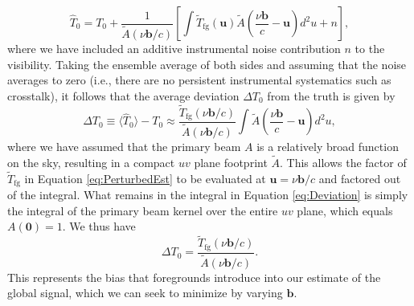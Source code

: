 \documentclass[twocolumn,apj,numberedappendix]{emulateapj}
\begin{document}
\begin{equation}
\label{eq:PerturbedEst}
\widehat{T}_0 = T_0 + \frac{1}{\widetilde{A} \left( \nu \mathbf{b} / c \right)} \left[ \int  \widetilde{T}_\textrm{fg} (\mathbf{u}) \widetilde{A} \left( \frac{\nu \mathbf{b}}{c} - \mathbf{u} \right) d^2 u + n \right],
\end{equation}
where we have included an additive instrumental noise contribution $n$ to the visibility.  Taking the ensemble average of both sides and assuming that the noise averages to zero (i.e., there are no persistent instrumental systematics such as crosstalk), it follows that the average deviation $\Delta T_0$ from the truth is given by
\begin{equation}
\label{eq:Deviation}
\Delta T_0 \equiv \langle \widehat{T}_0 \rangle - T_0 \approx \frac{\widetilde{T}_\textrm{fg} (\nu \mathbf{b} / c)}{\widetilde{A} \left( \nu \mathbf{b} / c \right)} \int   \widetilde{A} \left( \frac{\nu \mathbf{b}}{c} - \mathbf{u} \right) d^2 u,
\end{equation}
where we have assumed that the primary beam $A$ is a relatively broad function on the sky, resulting in a compact $uv$ plane footprint $\widetilde{A}$.  This allows the factor of $\widetilde{T}_\textrm{fg}$ in Equation \eqref{eq:PerturbedEst} to be evaluated at $\mathbf{u} = \nu \mathbf{b} / c$ and factored out of the integral. What remains in the integral in Equation \eqref{eq:Deviation} is simply the integral of the primary beam kernel over the entire $uv$ plane, which equals $A(\mathbf{0}) = 1$. We thus have
\begin{equation}
\Delta T_0 = \frac{\widetilde{T}_\textrm{fg} (\nu \mathbf{b} / c)}{\widetilde{A} \left( \nu \mathbf{b} / c \right)}.
\end{equation}
This represents the bias that foregrounds introduce into our estimate of the global signal, which we can seek to minimize by varying $\mathbf{b}$.
\end{document}
